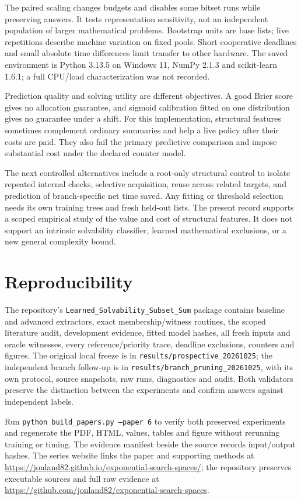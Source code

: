 \documentclass[10pt,english]{article}
\begin{document}
The paired scaling changes budgets and disables some bitset runs while preserving answers. It tests representation sensitivity, not an independent population of larger mathematical problems. Bootstrap units are base lists; live repetitions describe machine variation on fixed pools. Short cooperative deadlines and small absolute time differences limit transfer to other hardware. The saved environment is Python 3.13.5 on Windows 11, NumPy 2.1.3 and scikit-learn 1.6.1; a full CPU/load characterization was not recorded.

Prediction quality and solving utility are different objectives. A good Brier score gives no allocation guarantee, and sigmoid calibration fitted on one distribution gives no guarantee under a shift. For this implementation, structural features sometimes complement ordinary summaries and help a live policy after their costs are paid. They also fail the primary predictive comparison and impose substantial cost under the declared counter model.

The next controlled alternatives include a root-only structural control to isolate repeated internal checks, selective acquisition, reuse across related targets, and prediction of branch-specific net time saved. Any fitting or threshold selection needs its own training trees and fresh held-out lists. The present record supports a scoped empirical study of the value and cost of structural features. It does not support an intrinsic solvability classifier, learned mathematical exclusions, or a new general complexity bound.

\section{Reproducibility}
The repository's \texttt{Learned\_Solvability\_Subset\_Sum} package contains baseline and advanced extractors, exact membership/witness routines, the scoped literature audit, development evidence, fitted model hashes, all fresh inputs and oracle witnesses, every reference/priority trace, deadline exclusions, counters and figures. The original local freeze is in \texttt{results/prospective\_20261025}; the independent branch follow-up is in \texttt{results/branch\_pruning\_20261025}, with its own protocol, source snapshots, raw runs, diagnostics and audit. Both validators preserve the distinction between the experiments and confirm answers against independent labels.

Run \texttt{python build\_papers.py --paper 6} to verify both preserved experiments and regenerate the PDF, HTML, values, tables and figure without rerunning training or timing. The evidence manifest beside the source records input/output hashes. The series website links the paper and supporting methods at \url{https://jonland82.github.io/exponential-search-spaces/}; the repository preserves executable sources and full raw evidence at \url{https://github.com/jonland82/exponential-search-spaces}.
\end{document}
